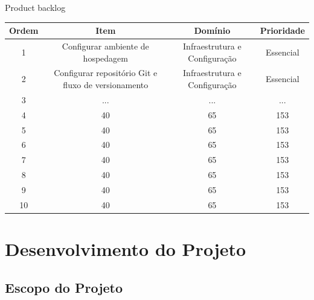 \documentclass[
	12pt,				%
	openany,			%
	twoside,			%
	a4paper,			%
	english,			%
	french,				%
	spanish,			%
	brazil				%
	]{abntex2}
\begin{document}
\begin{quadro}[htb]
	\caption{Product backlog}
	\label{quadro_product_backlog}
	\begin{tabular}{|c|c|c|c|}
		\hline
		\textbf{Ordem} & \textbf{Item} & \textbf{Domínio} & \textbf{Prioridade} \\ \hline
		1 & Configurar ambiente de hospedagem & Infraestrutura e Configuração   & Essencial    \\ \hline
		2 & Configurar repositório Git e fluxo de versionamento & Infraestrutura e Configuração & Essencial  \\ \hline
		3 & ...   & ...  & ...    \\ \hline
		4 & 40    & 65   & 153    \\ \hline
		5 & 40    & 65   & 153    \\ \hline
		6 & 40    & 65   & 153    \\ \hline
		7 & 40    & 65   & 153    \\ \hline
		8 & 40    & 65   & 153    \\ \hline
		9 & 40    & 65   & 153    \\ \hline
		10 & 40    & 65   & 153    \\ \hline
	\end{tabular}
\end{quadro}


\chapter{Desenvolvimento do Projeto}
\section{Escopo do Projeto}
\end{document}
